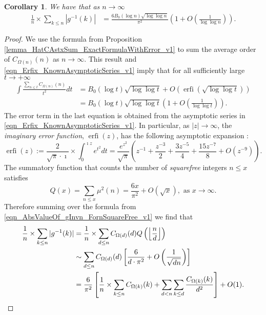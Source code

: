 \documentclass[11pt,reqno,a4letter]{article}
\numberwithin{figure}{section}
\numberwithin{table}{section}
\newcommand{\seqnum}[1]{\href{http://oeis.org/#1}{\color{ProcessBlue}{\underline{#1}}}}
\newcommand{\Floor}[2]{\ensuremath{\left\lfloor \frac{#1}{#2} \right\rfloor}}
\theoremstyle{plain}
\newtheorem{cor}[theorem]{Corollary}
\numberwithin{theorem}{section}
\theoremstyle{definition}
\begin{document}
\begin{cor}
\label{cor_ExpectationFormulaAbsgInvn_v2} 
We have that as $n \rightarrow \infty$ 
\begin{align*} 
\frac{1}{n} \times \sum_{k \leq n} |g^{-1}(k)| & = 
     \frac{6B_0 (\log n) \sqrt{\log\log n}}{\pi^2} 
     \left(1 + O\left(\frac{1}{\log\log n}\right)\right). 
\end{align*} 
\end{cor} 
\begin{proof} 
We use the formula from Proposition \ref{lemma_HatCAstxSum_ExactFormulaWithError_v1} 
to sum the average order of $C_{\Omega(n)}(n)$ as $n \rightarrow \infty$.
This result and \eqref{eqn_Erfix_KnownAsymptoticSeries_v1} 
imply that for all sufficiently large $t \rightarrow +\infty$ 
\begin{align*} 
\int \frac{\sum_{n \leq t} C_{\Omega(n)}(n)}{t^2} dt & = 
     B_0 (\log t) \sqrt{\log\log t} + O\left(\operatorname{erfi}\left( 
     \sqrt{\log\log t}\right)\right) \\ 
     & = 
     B_0 (\log t) \sqrt{\log\log t} \left(1 + O\left(\frac{1}{\log\log t}\right)\right). 
\end{align*} 
The error term in the last equation is obtained from the 
asymptotic series in \eqref{eqn_Erfix_KnownAsymptoticSeries_v1}. 
In particular, as $|z| \rightarrow \infty$, the \emph{imaginary error function}, 
$\operatorname{erfi}(z)$, has the following asymptotic expansion 
\cite[\S 7.12]{NISTHB}: 
\begin{equation}
\label{eqn_Erfix_KnownAsymptoticSeries_v1}
\operatorname{erfi}(z) := \frac{2}{\sqrt{\pi} \cdot \imath} \times \int_0^{\imath z} e^{t^2} dt = 
     \frac{e^{z^2}}{\sqrt{\pi}} \left(z^{-1} + \frac{z^{-3}}{2} + 
     \frac{3z^{-5}}{4} + \frac{15 z^{-7}}{8} + O\left(z^{-9}\right)\right). 
\end{equation}
The summatory function that counts the 
number of \emph{squarefree} integers $n \leq x$ satisfies 
\cite[\S 18.6]{HARDYWRIGHT} \cite[\seqnum{A013928}]{OEIS} 
\[ 
Q(x) = \sum_{n \leq x} \mu^2(n) = \frac{6x}{\pi^2} + O\left(\sqrt{x}\right), 
     \text{\ as $x \rightarrow \infty$}. 
\]
Therefore summing over the formula from 
\eqref{eqn_AbsValueOf_gInvn_FornSquareFree_v1} we find that  
\begin{align} 
\notag 
\frac{1}{n} \times \sum_{k \leq n} |g^{-1}(k)| & = \frac{1}{n} \times \sum_{d \leq n} 
     C_{\Omega(d)}(d) Q\left(\Floor{n}{d}\right) \\ 
\notag 
     & \sim \sum_{d \leq n} C_{\Omega(d)}(d) \left[\frac{6}{d \cdot \pi^2} + O\left(\frac{1}{\sqrt{dn}}\right) 
     \right] \\ 
\notag 
     & = \frac{6}{\pi^2} \left[\frac{1}{n} \times \sum_{k \leq n} C_{\Omega(k)}(k) + \sum_{d<n} 
     \sum_{k \leq d} \frac{C_{\Omega(k)}(k)}{d^2}\right] + O(1). 
     \qedhere 
\end{align} 
\end{proof} 
\end{document}
